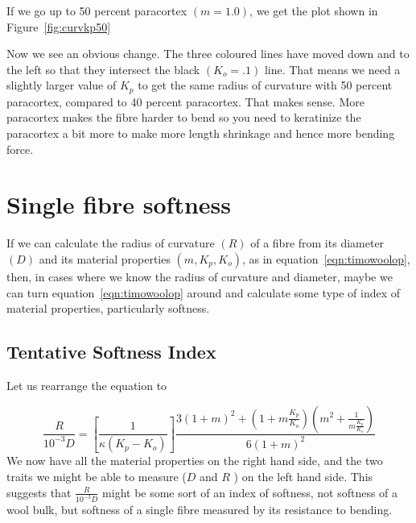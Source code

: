 \documentclass[titlepage]{article}  %
\begin{document}
If we go up to 50 percent paracortex $(m=1.0)$, we get the plot shown in Figure~\ref{fig:curvkp50}

Now we see an obvious change. The three coloured lines have moved down and to the left so that they intersect the black $(K_{o}=.1)$ line. That means we need a slightly larger value of $K_{p}$ to get the same radius of curvature with 50 percent paracortex, compared to 40 percent paracortex. That makes sense. More paracortex makes the fibre harder to bend so you need to keratinize the paracortex a bit more to make more length shrinkage and hence more bending force.

\section{Single fibre softness}
If we can calculate the radius of curvature $(R)$ of a fibre from its diameter $(D)$ and its material properties $(m, K_{p}, K_{o})$, as in equation~\ref{eqn:timowoolop}, then, in cases where we know the radius of curvature and diameter, maybe we can turn equation~\ref{eqn:timowoolop} around and calculate some type of index of material properties, particularly softness. 

\subsection{Tentative Softness Index}
Let us rearrange the equation to

\begin{equation}
\label{eqn:timosoft}
\frac{R}{10^{-3}D} = \left[ \frac{1}{\kappa (K_{p} - K_{o})} \right] \frac{ 3(1+m)^{2}+(1+m \frac{K_{p}}{K_{o}})(m^{2}+\frac{1}{m \frac{K_{p}}{K_{o}}})} {6(1+m)^{2}}
\end{equation}
We now have all the material properties on the right hand side, and the two traits we might be able to measure ($D$ and $R$ ) on the left hand side. This suggests that $\frac{R}{10^{-3}D}$ might be some sort of an index of softness, not softness of a wool bulk, but softness of a single fibre measured by its resistance to bending.
\end{document}
